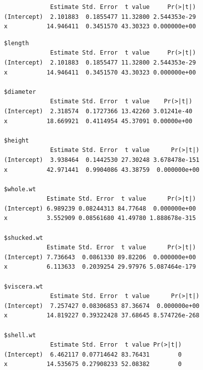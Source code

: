 \documentclass[
  11pt,
]{krantz}
\newenvironment{Shaded}{\begin{snugshade}}{\end{snugshade}}
\newcommand{\CommentTok}[1]{\textcolor[rgb]{0.37,0.37,0.37}{\textit{#1}}}
\newcommand{\ControlFlowTok}[1]{\textcolor[rgb]{0.27,0.27,0.27}{\textbf{#1}}}
\newcommand{\DecValTok}[1]{\textcolor[rgb]{0.06,0.06,0.06}{#1}}
\newcommand{\KeywordTok}[1]{\textcolor[rgb]{0.27,0.27,0.27}{\textbf{#1}}}
\newcommand{\NormalTok}[1]{#1}
\newcommand{\OperatorTok}[1]{\textcolor[rgb]{0.43,0.43,0.43}{\textbf{#1}}}
\newcommand{\StringTok}[1]{\textcolor[rgb]{0.5,0.5,0.5}{#1}}
\begin{document}
\begin{Shaded}
\end{Shaded}

\begin{verbatim}
             Estimate Std. Error  t value     Pr(>|t|)
(Intercept)  2.101883  0.1855477 11.32800 2.544353e-29
x           14.946411  0.3451570 43.30323 0.000000e+00
\end{verbatim}

\begin{Shaded}
\end{Shaded}

\begin{verbatim}
$length
             Estimate Std. Error  t value     Pr(>|t|)
(Intercept)  2.101883  0.1855477 11.32800 2.544353e-29
x           14.946411  0.3451570 43.30323 0.000000e+00

$diameter
             Estimate Std. Error  t value    Pr(>|t|)
(Intercept)  2.318574  0.1727366 13.42260 3.01241e-40
x           18.669921  0.4114954 45.37091 0.00000e+00

$height
             Estimate Std. Error  t value      Pr(>|t|)
(Intercept)  3.938464  0.1442530 27.30248 3.678478e-151
x           42.971441  0.9904086 43.38759  0.000000e+00

$whole.wt
            Estimate Std. Error  t value      Pr(>|t|)
(Intercept) 6.989239 0.08244313 84.77648  0.000000e+00
x           3.552909 0.08561680 41.49780 1.888678e-315

$shucked.wt
            Estimate Std. Error  t value      Pr(>|t|)
(Intercept) 7.736643  0.0861330 89.82206  0.000000e+00
x           6.113633  0.2039254 29.97976 5.087464e-179

$viscera.wt
             Estimate Std. Error  t value      Pr(>|t|)
(Intercept)  7.257427 0.08306853 87.36674  0.000000e+00
x           14.819227 0.39322428 37.68645 8.574726e-268

$shell.wt
             Estimate Std. Error  t value Pr(>|t|)
(Intercept)  6.462117 0.07714642 83.76431        0
x           14.535675 0.27908233 52.08382        0
\end{verbatim}
\end{document}
